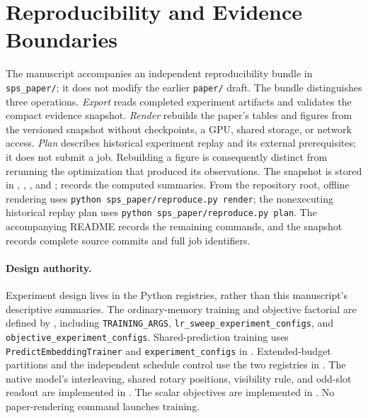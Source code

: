 \section{Reproducibility and Evidence Boundaries}
\label{app:repro}

The manuscript accompanies an independent reproducibility bundle in \texttt{sps\_paper/}; it does not modify the earlier \texttt{paper/} draft.
The bundle distinguishes three operations.
\emph{Export} reads completed experiment artifacts and validates the compact evidence snapshot.
\emph{Render} rebuilds the paper's tables and figures from the versioned snapshot without checkpoints, a GPU, shared storage, or network access.
\emph{Plan} describes historical experiment replay and its external prerequisites; it does not submit a job.
Rebuilding a figure is consequently distinct from rerunning the optimization that produced its observations.
The snapshot is stored in ,
, , and
;  records the computed summaries.
From the repository root, offline rendering uses
\texttt{python sps\_paper/reproduce.py render}; the nonexecuting historical replay plan uses
\texttt{python sps\_paper/reproduce.py plan}.
The accompanying README records the remaining commands, and the snapshot records complete source commits and full job identifiers.

\paragraph{Design authority.}
Experiment design lives in the Python registries, rather than this manuscript's descriptive summaries.
The ordinary-memory training and objective factorial are defined by
, including \texttt{TRAINING\_ARGS},
\texttt{lr\_sweep\_experiment\_configs}, and \texttt{objective\_experiment\_configs}.
Shared-prediction training uses \texttt{PredictEmbeddingTrainer} and
\texttt{experiment\_configs} in .
Extended-budget partitions and the independent schedule control use the two registries in
.
The native model's interleaving, shared rotary positions, visibility rule, and odd-slot readout are implemented in
.
The scalar objectives are implemented in .
No paper-rendering command launches training.

